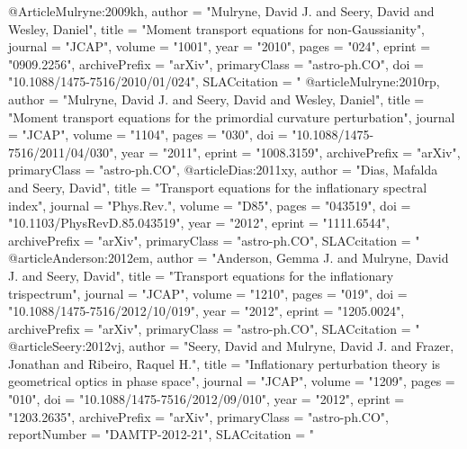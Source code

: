@Article{Mulryne:2009kh,
     author    = "Mulryne, David J. and Seery, David and Wesley, Daniel",
     title     = "{Moment transport equations for non-Gaussianity}",
     journal   = "JCAP",
     volume    = "1001",
     year      = "2010",
     pages     = "024",
     eprint    = "0909.2256",
     archivePrefix = "arXiv",
     primaryClass  =  "astro-ph.CO",
     doi       = "10.1088/1475-7516/2010/01/024",
     SLACcitation  = "%
}
@article{Mulryne:2010rp,
      author         = "Mulryne, David J. and Seery, David and Wesley, Daniel",
      title          = "{Moment transport equations for the primordial curvature
                        perturbation}",
      journal        = "JCAP",
      volume         = "1104",
      pages          = "030",
      doi            = "10.1088/1475-7516/2011/04/030",
      year           = "2011",
      eprint         = "1008.3159",
      archivePrefix  = "arXiv",
      primaryClass   = "astro-ph.CO",
}
@article{Dias:2011xy,
      author         = "Dias, Mafalda and Seery, David",
      title          = "{Transport equations for the inflationary spectral
                        index}",
      journal        = "Phys.Rev.",
      volume         = "D85",
      pages          = "043519",
      doi            = "10.1103/PhysRevD.85.043519",
      year           = "2012",
      eprint         = "1111.6544",
      archivePrefix  = "arXiv",
      primaryClass   = "astro-ph.CO",
      SLACcitation   = "%
}
@article{Anderson:2012em,
      author         = "Anderson, Gemma J. and Mulryne, David J. and Seery,
                        David",
      title          = "{Transport equations for the inflationary trispectrum}",
      journal        = "JCAP",
      volume         = "1210",
      pages          = "019",
      doi            = "10.1088/1475-7516/2012/10/019",
      year           = "2012",
      eprint         = "1205.0024",
      archivePrefix  = "arXiv",
      primaryClass   = "astro-ph.CO",
      SLACcitation   = "%
}
@article{Seery:2012vj,
      author         = "Seery, David and Mulryne, David J. and Frazer, Jonathan
                        and Ribeiro, Raquel H.",
      title          = "{Inflationary perturbation theory is geometrical optics
                        in phase space}",
      journal        = "JCAP",
      volume         = "1209",
      pages          = "010",
      doi            = "10.1088/1475-7516/2012/09/010",
      year           = "2012",
      eprint         = "1203.2635",
      archivePrefix  = "arXiv",
      primaryClass   = "astro-ph.CO",
      reportNumber   = "DAMTP-2012-21",
      SLACcitation   = "%
}
